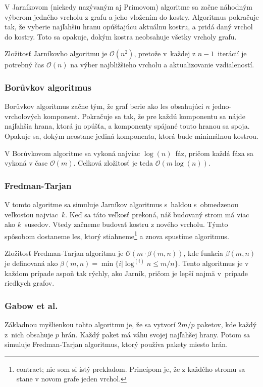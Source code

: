 V Jarníkovom (niekedy nazývaným aj Primovom) algoritme sa začne
náhodným výberom jedného vrcholu z grafu a jeho vložením do kostry.
Algoritmus pokračuje tak, že vyberie najľahšiu hranu opúšťajúcu
aktuálnu kostru, a pridá daný vrchol do kostry. Toto sa opakuje,
dokým kostra neobsahuje všetky vrcholy grafu.

Zložitosť Jarníkovho algoritmu je $\mathcal{O}(n^2)$, pretože
v~každej z $n-1$~iterácií je potrebný čas $\mathcal{O}(n)$ na výber
najbližšieho vrcholu a aktualizovanie vzdialeností.

\subsubsection{Borůvkov algoritmus}

Borůvkov algoritmus začne tým, že graf berie ako les obsahujúci
$n$ jedno-vrcholových komponent. Pokračuje sa tak, že pre každú
komponentu sa nájde najľahšia hrana, ktorá ju opúšťa, a komponenty
spájané touto hranou sa spoja. Opakuje sa, dokým neostane jediná 
komponenta, ktorá bude minimálnou kostrou.

V Borůvkovom algoritme sa vykoná najviac $\log(n)$~fáz, pričom
každá fáza sa vykoná v čase $\mathcal{O}(m)$. Celková zložitosť
je teda $\mathcal{O}(m \log(n))$.

\subsubsection{Fredman-Tarjan}

V tomto algoritme sa simuluje Jarníkov algoritmus s~haldou s~obmedzenou
veľkosťou najviac~$k$. Keď sa táto veľkosť prekoná, náš budovaný strom má 
viac ako $k$~susedov. Vtedy začneme budovať kostru z nového vrcholu. Týmto
spôsobom dostaneme les, ktorý stiahneme\footnote{contract; nie som si istý 
prekladom. Princípom je, že z každého stromu sa stane v novom grafe jeden
vrchol.} a znova spustíme algoritmus.

Zložitosť Fredman-Tarjan algoritmu je $\mathcal{O}(m \cdot \beta(m,n))$, kde
funkcia $\beta(m,n)$ je definovaná ako $\beta(m,n)= \min\{ i | \log^{(i)}n \leq m/n \}$.
Tento algoritmus je v každom prípade aspoň tak rýchly, ako Jarník, pričom
je lepší najmä v~prípade riedkych grafov.

\subsubsection{Gabow et al.}

Základnou myšlienkou tohto algoritmu je, že sa vytvorí $2m/p$ paketov,
kde každý z~nich obsahuje $p$ hrán. Každý paket má váhu svojej najľahšej
hrany. Potom sa simuluje Fredman-Tarjan algoritmus, ktorý používa pakety
miesto hrán.

